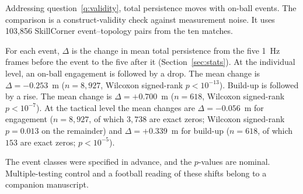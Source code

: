 Addressing question~\ref{q:validity}, total persistence moves with
on-ball events. The comparison is a construct-validity check against
measurement noise. It uses 103{,}856 SkillCorner event--topology pairs
from the ten matches.

For each event, $\Delta$ is the change in mean total persistence from
the five 1~Hz frames before the event to the five after it
(Section~\ref{sec:stats}). At the individual level, an on-ball
engagement is followed by a drop. The mean change is
$\Delta=-0.253$~m ($n=8{,}927$, Wilcoxon signed-rank $p<10^{-13}$).
Build-up is followed by a rise. The mean change is
$\Delta=+0.700$~m ($n=618$, Wilcoxon signed-rank $p<10^{-7}$). At the tactical level the mean changes are
$\Delta=-0.056$~m for engagement ($n=8{,}927$, of which $3{,}738$ are
exact zeros; Wilcoxon signed-rank $p=0.013$ on the remainder) and
$\Delta=+0.339$~m for build-up ($n=618$, of which $153$ are exact
zeros; $p<10^{-5}$).

The event classes were specified in advance, and the $p$-values are
nominal. Multiple-testing control and a football reading of these
shifts belong to a companion manuscript.
